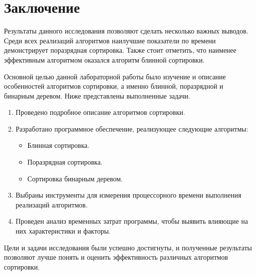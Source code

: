 \chapter*{Заключение}

Результаты данного исследования позволяют сделать несколько важных выводов. 
Среди всех реализаций алгоритмов наилучшие показатели по времени демонстрирует поразрядная сортировка.
Также стоит отметить, что наименее эффективным алгоритмом оказался алгоритм блинной сортировки.

Основной целью данной лабораторной работы было изучение и описание особенностей алгоритмов сортировки, а именно блинной, поразрядной и бинарным деревом.
Ниже представлены выполненные задачи.

\begin{enumerate}
\item Проведено подробное описание алгоритмов сортировки.
\item Разработано программное обеспечение, реализующее следующие алгоритмы:
\begin{itemize}[label=---]
\item Блинная сортировка.
\item Поразрядная сортировка.
\item Сортировка бинарным деревом.
\end{itemize}
\item Выбраны инструменты для измерения процессорного времени выполнения реализаций алгоритмов.
\item Проведен анализ временных затрат программы, чтобы выявить влияющие на них характеристики и факторы.
\end{enumerate}

Цели и задачи исследования были успешно достигнуты, и полученные результаты позволяют лучше понять и оценить эффективность различных алгоритмов сортировки.